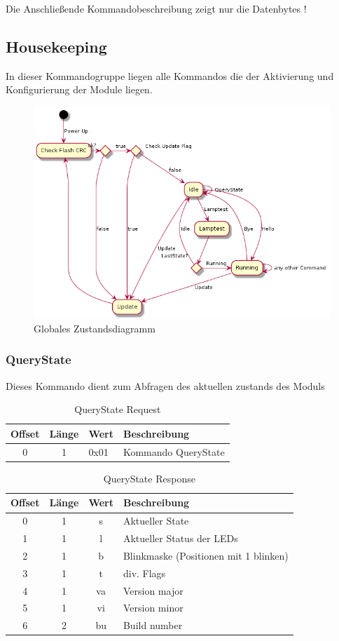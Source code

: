\documentclass[10pt,a4paper]{article}
\begin{document}
Die Anschließende Kommandobeschreibung zeigt nur die Datenbytes !

\subsection{Housekeeping}
\label{sec:Housekeeping}
In dieser Kommandogruppe liegen alle Kommandos die der Aktivierung und Konfigurierung der Module liegen. 
\begin{figure}[H]
\centering
\includegraphics[scale=0.5]{global_activity.png}
\caption{Globales Zustandsdiagramm}
\end{figure}

\subsubsection{QueryState}
\label{sec:QueryState}
Dieses Kommando dient zum Abfragen des aktuellen zustands des Moduls
\begin{table}[H]
\centering
\begin{tabular}{c|c|l|l}
\textbf{Offset} & \textbf{Länge} & \textbf{Wert} & \textbf{Beschreibung} \\ \hline
0 & 1 & 0x01 & Kommando QueryState 
\end{tabular}
\caption{QueryState Request}
\end{table}

\begin{table}[H]
\label{QUERYSTATE_RESP}
\centering
\begin{tabular}{c|c|c|l}
\textbf{Offset} & \textbf{Länge} & \textbf{Wert} & \textbf{Beschreibung} \\ \hline
0 & 1 & s & Aktueller State\\
1 & 1 & l & Aktueller Status der LEDs\\
2 & 1 & b & Blinkmaske (Positionen mit 1 blinken)\\
3 & 1 & t & div. Flags\\
4 & 1 & va & Version major\\
5 & 1 & vi & Version minor\\
6 & 2 & bu & Build number
\end{tabular}
\caption{QueryState Response}
\end{table}
\end{document}
